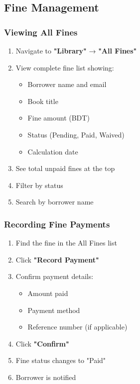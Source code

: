 \documentclass[12pt,a4paper]{article}
\begin{document}
\newpage

\subsection{Fine Management}

\subsubsection{Viewing All Fines}
\begin{enumerate}[leftmargin=*]
    \item Navigate to \textbf{"Library"} → \textbf{"All Fines"}
    \item View complete fine list showing:
        \begin{itemize}
            \item Borrower name and email
            \item Book title
            \item Fine amount (BDT)
            \item Status (Pending, Paid, Waived)
            \item Calculation date
        \end{itemize}
    \item See total unpaid fines at the top
    \item Filter by status
    \item Search by borrower name
\end{enumerate}

\subsubsection{Recording Fine Payments}
\begin{enumerate}[leftmargin=*]
    \item Find the fine in the All Fines list
    \item Click \textbf{"Record Payment"}
    \item Confirm payment details:
        \begin{itemize}
            \item Amount paid
            \item Payment method
            \item Reference number (if applicable)
        \end{itemize}
    \item Click \textbf{"Confirm"}
    \item Fine status changes to "Paid"
    \item Borrower is notified
\end{enumerate}
\end{document}
